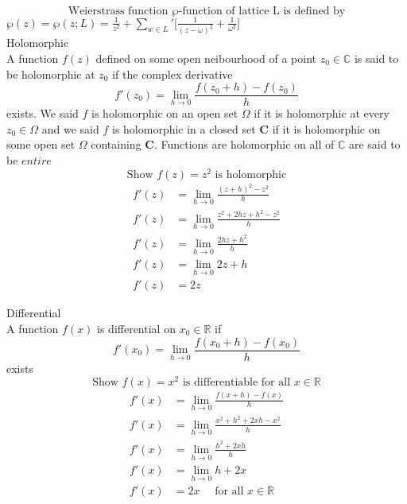 \documentclass[10pt]{article}
\begin{document}
\noindent
\[\text{Weierstrass function } \wp \text{-function of lattice L is defined by} \]
$\wp(z) = \wp(z; L) = \frac{1}{z^2} + \sum_{w \in L}' \big[ \frac{1}{(z-\omega)^2} + \frac{1}{\omega^2} \big]$\\

\noindent
Holomorphic\\
A function $f(z)$ defined on some open neibourhood of a point $z_{0} \in \mathbb{C}$ is said to be holomorphic at $z_{0}$ if the complex derivative 
\[ f'(z_{0}) = \lim_{h \to 0 } \frac{f(z_{0} + h) - f(z_{0})}{h} \] exists.
We said $f$ is holomorphic on an open set $\Omega$ if it is holomorphic at every $z_{0} \in \Omega$ and we said $f$ is holomorphic in a closed set $\mathbf{C}$ if it is holomorphic on some open set $\Omega$ containing $\mathbf{C}$.
Functions are holomorphic on all of $\mathbb{C}$ are said to be $\mathit{entire}$\\

\noindent
\[ \text{Show } f(z) = z^2 \text{ is holomorphic} \]
\begin{equation}
\begin{aligned}
f'(z) &= \lim_{h \to 0} \frac{(z+h)^2 - z^2}{h} \\
f'(z) &= \lim_{h \to 0} \frac{z^2 + 2hz + h^2 - z^2}{h}\\
f'(z) &= \lim_{h \to 0} \frac{2hz + h^2}{h} \nonumber \\
f'(z) &= \lim_{h \to 0} 2z + h\\
f'(z) &= 2z
\end{aligned}
\end{equation}

\pagebreak
\noindent
Differential\\
A function $f(x)$ is differential on $x_{0} \in \mathbb{R}$ if \\
\[  f'(x_{0}) =  \lim_{h \to 0} \frac{f(x_{0} +h) - f(x_{0})}{h} \]
exists\\

\[\text{Show } f(x) = x^{2} \text{ is differentiable for all } x  \in \mathbb{R} \]
\begin{equation}
\begin{aligned}
f'(x) &=  \lim_{h \to 0} \frac{f(x +h) - f(x)}{h}\\
f'(x) &= \lim_{h \to 0} \frac{x^2 + h^2 + 2xh - x^2  }{h} \nonumber \\
f'(x) &= \lim_{h \to 0} \frac{h^2 + 2xh}{h}\\
f'(x) &= \lim_{h \to 0} h+2x\\     
f'(x) &= 2x \quad \text{ for all } x \in \mathbb{R}
\end{aligned}
\end{equation}
\end{document}
